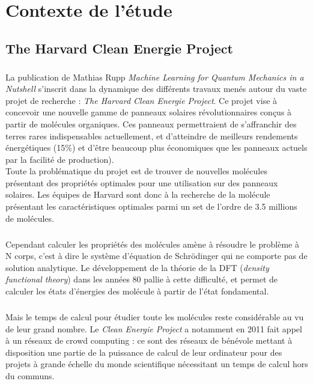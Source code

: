 \documentclass[a4paper,12pt,titlepage]{report}
\begin{document}
\chapter{Contexte de l'étude}
\section{The Harvard Clean Energie Project}
\paragraph{}
La publication de Mathias Rupp \textit{Machine Learning for Quantum Mechanics in a Nutshell} s'inscrit dans la dynamique des différents travaux menés autour du vaste projet de recherche : \textit{The Harvard Clean Energie Project}. Ce projet vise à concevoir une nouvelle gamme de panneaux solaires révolutionnaires conçus à partir de molécules organiques. Ces panneaux permettraient de s'affranchir des terres rares indispensables actuellement, et d'atteindre de meilleurs rendements énergétiques (15\%) et d'être beaucoup plus économiques que les panneaux actuels par la facilité de production).\\
Toute la problématique du projet est de trouver de nouvelles molécules présentant des propriétés optimales pour une utilisation sur des panneaux solaires. 
Les équipes de Harvard sont donc à la recherche de la molécule présentant les caractéristiques optimales parmi un set de l'ordre de 3.5 millions de molécules.
\paragraph{}
Cependant calculer les propriétés des molécules amène à résoudre le problème à N corps, c'est à dire le système d'équation de Schrödinger qui ne comporte pas de solution analytique. 
Le développement de la théorie de la DFT (\textit{density functional theory}) dans les années 80 pallie à cette difficulté, et permet de calculer les états d'énergies des molécule à partir de l'état fondamental. 
\paragraph{}
Mais le temps de calcul pour étudier toute les molécules reste considérable au vu de leur grand nombre. Le \textit{Clean Energie Project} a notamment en 2011 fait appel à un réseaux de crowd computing : ce sont des réseaux de bénévole mettant à disposition une partie de la puissance de calcul de leur ordinateur pour des projets à grande échelle du monde scientifique nécessitant un temps de calcul hors du communs.  
\end{document}
